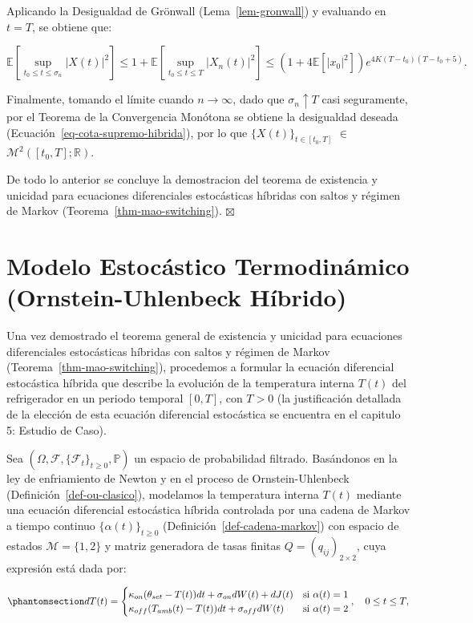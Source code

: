 \documentclass[
  spanish,
  letterpaper,
  DIV=11,
  numbers=noendperiod]{scrreprt}
\theoremstyle{plain}
\theoremstyle{plain}
\theoremstyle{plain}
\theoremstyle{definition}
\theoremstyle{remark}
\begin{document}
Aplicando la Desigualdad de Grönwall (Lema~\ref{lem-gronwall}) y
evaluando en \(t = T\), se obtiene que:

\[
\mathbb{E}\left[ \sup_{t_0 \le t \le \sigma_n} \vert X(t) \vert^2 \right] \le 1 + \mathbb{E}\left[ \sup_{t_0 \le t \le T} \vert X_n(t) \vert^2 \right] \le \left( 1 + 4\mathbb{E}[\vert x_0 \vert^2] \right) e^{4K(T - t_0)(T - t_0 + 5)}.
\]

Finalmente, tomando el límite cuando \(n \to \infty\), dado que
\(\sigma_n \uparrow T\) casi seguramente, por el Teorema de la
Convergencia Monótona se obtiene la desigualdad deseada
(Ecuación~\ref{eq-cota-supremo-hibrida}), por lo que
\(\{X(t)\}_{t \in [t_0, T]}\) \(\in\)
\(\mathcal{M}^2([t_0, T]; \mathbb{R})\).

De todo lo anterior se concluye la demostracion del teorema de
existencia y unicidad para ecuaciones diferenciales estocásticas
híbridas con saltos y régimen de Markov
(Teorema~\ref{thm-mao-switching}). \(\boxtimes\)

\section{Modelo Estocástico Termodinámico (Ornstein-Uhlenbeck
Híbrido)}\label{modelo-estocuxe1stico-termodinuxe1mico-ornstein-uhlenbeck-huxedbrido}

Una vez demostrado el teorema general de existencia y unicidad para
ecuaciones diferenciales estocásticas híbridas con saltos y régimen de
Markov (Teorema~\ref{thm-mao-switching}), procedemos a formular la
ecuación diferencial estocástica híbrida que describe la evolución de la
temperatura interna \(T(t)\) del refrigerador en un periodo temporal
\([0, T]\), con \(T > 0\) (la justificación detallada de la elección de
esta ecuación diferencial estocástica se encuentra en el capitulo 5:
Estudio de Caso).

Sea \((\Omega, \mathcal{F}, \{\mathcal{F}_t\}_{t \ge 0}, \mathbb{P})\)
un espacio de probabilidad filtrado. Basándonos en la ley de
enfriamiento de Newton y en el proceso de Ornstein-Uhlenbeck
(Definición~\ref{def-ou-clasico}), modelamos la temperatura interna
\(T(t)\) mediante una ecuación diferencial estocástica híbrida
controlada por una cadena de Markov a tiempo continuo
\(\{\alpha(t)\}_{t \ge 0}\) (Definición~\ref{def-cadena-markov}) con
espacio de estados \(\mathcal{M} = \{1, 2\}\) y matriz generadora de
tasas finitas \(Q = (q_{ij})_{2 \times 2}\), cuya expresión está dada
por:

\begin{equation}\phantomsection\label{eq-ede-operativa-teorica}{
dT(t) = 
\begin{cases} 
\kappa_{on}(\theta_{set} - T(t))dt + \sigma_{on}dW(t) + dJ(t) & \text{si } \alpha(t) = 1 \\ 
\kappa_{off}(T_{amb}(t) - T(t))dt + \sigma_{off}dW(t) & \text{si } \alpha(t) = 2 
\end{cases}, \quad 0 \leq t \leq T,
}\end{equation}
\end{document}
